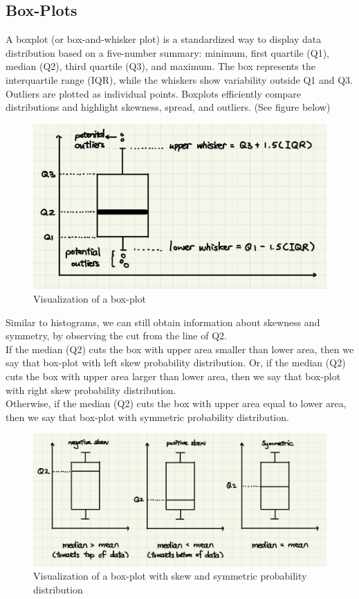 \subsection{Box-Plots}
A boxplot (or box-and-whisker plot) is a standardized way to display data distribution based on a five-number summary: minimum, first quartile (Q1), median (Q2), third quartile (Q3), and maximum. The box represents the interquartile range (IQR), while the whiskers show variability outside Q1 and Q3. Outliers are plotted as individual points. Boxplots efficiently compare distributions and highlight skewness, spread, and outliers. (See figure below)

\begin{figure}[H]
 \centering
 \includegraphics[scale=0.25]{Section1/img/BoxPlot.jpg}
 \caption{Visualization of a box-plot}
\end{figure} 

\noindent
Similar to histograms, we can still obtain information about skewness and symmetry, by observing the cut from the line of Q2.\\

\noindent
If the median (Q2) cuts the box with upper area smaller than lower area, then we say that box-plot with left skew probability distribution. Or, if the median (Q2) cuts the box with upper area larger than lower area, then we say that box-plot with right skew probability distribution.\\

\noindent
Otherwise, if the median (Q2) cuts the box with upper area equal to lower area, then we say that box-plot with symmetric probability distribution.

\begin{figure}[H]
\centering
\includegraphics[scale=0.15]{Section1/img/Bskew.jpg}
\caption{Visualization of a box-plot with skew and symmetric probability distribution}
\end{figure}

